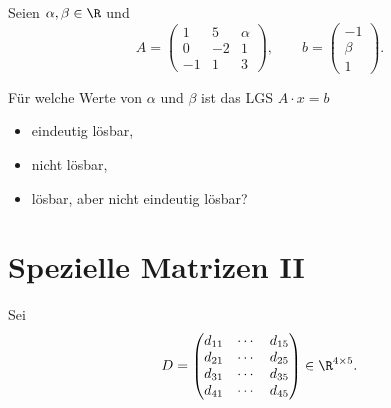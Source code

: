 Seien $\alpha,\beta \in \R$ und
$$
	A =
	\begin{pmatrix}
		1	&5	&\alpha	\\
		0	&-2	&1	\\
		-1	&1	&3
	\end{pmatrix},
	\qquad
	b =
	\begin{pmatrix}
		-1	\\
		\beta	\\
		1
	\end{pmatrix}.
$$

F\"ur welche Werte von $\alpha$ und $\beta$ ist das LGS $A\cdot x = b$
\begin{itemize}
	\item eindeutig l\"osbar,
	\item nicht l\"osbar,
	\item l\"osbar, aber nicht eindeutig l\"osbar?
\end{itemize}


\section{Spezielle Matrizen II}

Sei 
$$
	D = 
	\begin{pmatrix}
		d_{11}	&\cdots	&d_{15}\\
		d_{21}	&\cdots	&d_{25}\\		
		d_{31}	&\cdots	&d_{35}\\
		d_{41}	&\cdots	&d_{45}\\
	\end{pmatrix}
	\in \R^{4\times 5}.
$$

